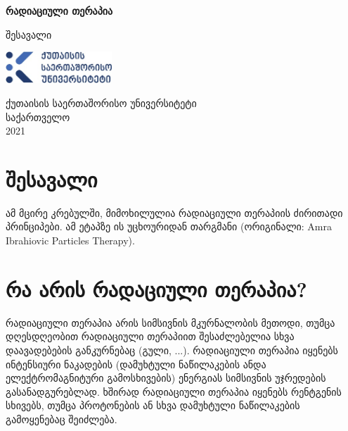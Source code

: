 \documentclass[12pt,a4paper,]{report}
\begin{document}
\begin{titlepage}
   \begin{center}
       \vspace*{1cm}

       \textbf{რადიაციული თერაპია}

       \vspace{0.5cm}
        შესავალი
            
       \vspace{1.5cm}

       \textbf{}

       \vfill
            
            
       \vspace{0.8cm}
     
       \includegraphics[width=0.3\textwidth]{images/kiu_logo}
            
       ქუთაისის საერთაშორისო უნივერსიტეტი\\
       საქართველო\\
       2021
            
   \end{center}
\end{titlepage}

\tableofcontents

\chapter{შესავალი}
ამ მცირე კრებულში, მიმოხილულია რადიაციული თერაპიის ძირითადი პრინციპები. ამ ეტაპზე ის უცხოურიდან თარგმანი (ორიგინალი: Amra Ibrahiovic Particles Therapy). 

\pagebreak

\chapter{რა არის რადაციული თერაპია?}
რადიაციული თერაპია არის სიმსივნის მკურნალობის მეთოდი, თუმცა დღესდღეობით რადიაციული თერაპიით შესაძლებელია სხვა დაავადებების განკურნებაც (გული, ...). რადიაციული თერაპია იყენებს ინტენსიური ნაკადების (დამუხტული ნაწილაკების ანდა ელექტრომაგნიტური გამოსხივების) ენერგიას სიმსივნის უჯრედების გასანადგურებლად. ხშირად რადიაციული თერაპია იყენებს რენტგენის სხივებს, თუმცა პროტონების ან სხვა დამუხტული ნაწილაკების გამოყენებაც შეიძლება.
\end{document}
